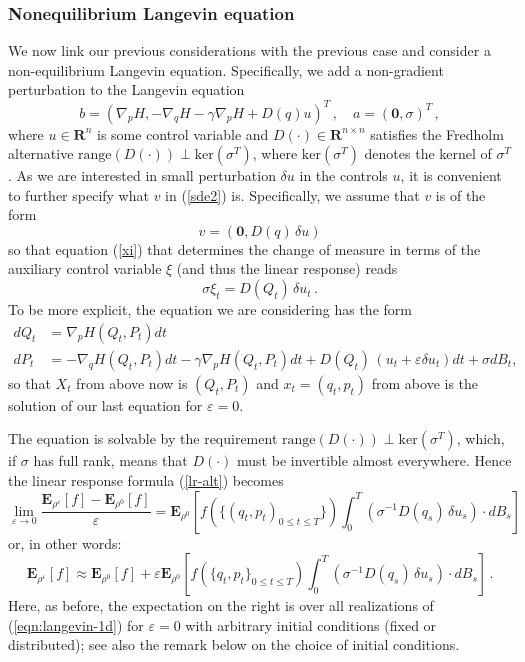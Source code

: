 \documentclass[]{tMPH2e}
\newcommand{\R}{{\mathbf R}}
\newcommand{\eps}{\varepsilon}
\newcommand{\bE}{{\mathbf E}}
\newcommand{\zero}{{\mathbf 0}}
\begin{document}
\subsubsection*{Nonequilibrium Langevin equation}

We now link our previous considerations with the previous case and consider a non-equilibrium Langevin equation. Specifically, we add a non-gradient perturbation to the Langevin equation 
\begin{equation}\label{eqn:langevin-1b}
b = \left(\nabla_{p}H, -\nabla_{q} H - \gamma\nabla_{p}H  + D(q) u \right)^{T}\,,\quad a= (\zero,\sigma)^{T}\,,
\end{equation}
where $u\in\R^{n}$ is some control variable and $D(\cdot)\in\R^{n\times n}$ satisfies the Fredholm alternative $\mathrm{range}(D(\cdot))\perp \mathrm{ker}(\sigma^{T})$, where $\mathrm{ker}(\sigma^T)$ denotes the kernel of $\sigma^T$. As we are interested in small perturbation $\delta u$ in the controls $u$, it is convenient to further specify what $v$ in (\ref{sde2}) is. Specifically, we assume that $v$ is of the form 
\begin{equation}\label{eqn:langevin-1c}
v = (\zero, D(q)\,\delta u)
\end{equation}
so that equation (\ref{xi}) that determines the change of measure in terms of the auxiliary control variable $\xi$ (and thus the linear response) reads 
\[
\sigma \xi_{t} = D(Q_{t})\,\delta u_{t}\,.
\]
To be more explicit, the equation we are considering has the form
\begin{equation}\label{eqn:langevin-1d}
\begin{aligned}
dQ_t & =  \nabla_p H(Q_t,P_t)dt\\
dP_t & =  -\nabla_q H(Q_t,P_t)dt - \gamma \nabla_p H(Q_t,P_t)dt + D(Q_t)\,(u_t+\eps \delta u_t)dt+\sigma dB_t,
\end{aligned}
\end{equation}
so that $X_t$ from above now is $(Q_t,P_t)$ and $x_t=(q_t,p_t)$ from above is the solution of our last equation for $\eps=0$.

The equation is solvable by the requirement  $\mathrm{range}(D(\cdot))\perp \mathrm{ker}(\sigma^{T})$, which, if $\sigma$ has full rank, means that $D(\cdot)$ must be invertible almost everywhere. Hence the linear response formula (\ref{lr-alt})  becomes
\begin{equation}\label{lr-alt2}
\lim_{\eps\to 0}\frac{\bE_{\rho^{\eps}}[f] - \bE_{\rho^{0}}[f]}{\eps} =  \bE_{\rho^{0}}\left[f(\{(q_{t},p_{t})_{0\le t\le T}\})\int_{0}^{T}(\sigma^{-1}D(q_{s})\,\delta u_{s})\cdot dB_{s} \right]\,
\end{equation}
or, in other words: 
\begin{equation}\label{eqn:neq-response}
\bE_{\rho^{\eps}}[f] \approx \bE_{\rho^0}[f] + \eps\bE_{\rho^0}\left[f(\{q_{t},p_{t}\}_{0\le t\le T})\int_{0}^{T}(\sigma^{-1}D(q_{s})\,\delta u_{s})\cdot dB_{s} \right]\,.
\end{equation}
Here, as before, the expectation on the right is over all realizations of (\ref{eqn:langevin-1d}) for $\eps=0$ with arbitrary initial conditions (fixed or distributed); see also the remark below on the choice of initial conditions. 
\end{document}
